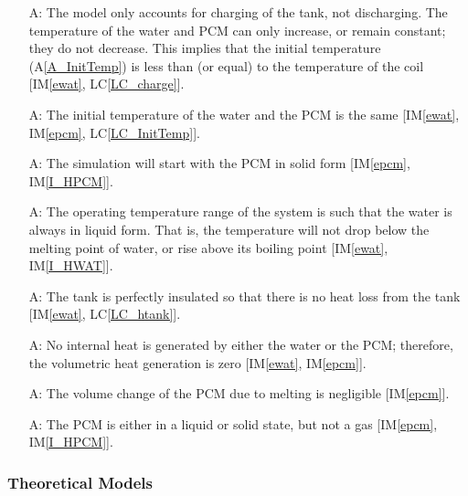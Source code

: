 \documentclass[12pt]{article}
\newcounter{assumpnum} %
\newcommand{\aref}[1]{A\ref{#1}}
\newcommand{\iref}[1]{IM\ref{#1}}
\newcommand{\lcref}[1]{LC\ref{#1}}
\begin{document}
\begin{itemize}
\item[A\refstepcounter{assumpnum}\theassumpnum \label{A_charge}:] The model only
  accounts for charging of the tank, not discharging.  The temperature of the
  water and PCM can only increase, or remain constant; they do not decrease.
  This implies that the initial temperature (\aref{A_InitTemp}) is less than (or
  equal) to the temperature of the coil [\iref{ewat}, \lcref{LC_charge}].

\item[A\refstepcounter{assumpnum}\theassumpnum \label{A_InitTemp}:] The
  initial temperature of the water and the PCM is the same [\iref{ewat},
  \iref{epcm}, \lcref{LC_InitTemp}].

\item[A\refstepcounter{assumpnum}\theassumpnum \label{A_OpRangePCM}:] The
  simulation will start with the PCM in solid form [\iref{epcm}, \iref{I_HPCM}].

\item[A\refstepcounter{assumpnum}\theassumpnum \label{A_OpRange}:] The operating
  temperature range of the system is such that the water is always in liquid
  form.  That is, the temperature will not drop below the melting point of water, or rise
  above its boiling point [\iref{ewat}, \iref{I_HWAT}].

\item[A\refstepcounter{assumpnum}\theassumpnum \label{A_htank}:] The tank is
  perfectly insulated so that there is no heat loss from the tank [\iref{ewat},
  \lcref{LC_htank}].

\item[A\refstepcounter{assumpnum}\theassumpnum \label{A_int_heat}:] No internal
  heat is generated by either the water or the PCM; therefore, the volumetric
  heat generation is zero [\iref{ewat}, \iref{epcm}].
	
\item[A\refstepcounter{assumpnum}\theassumpnum \label{A_vpcm}:] The volume
  change of the PCM due to melting is negligible [\iref{epcm}].

\item[A\refstepcounter{assumpnum}\theassumpnum \label{A_PCM_state}:] The PCM is
  either in a liquid or solid state, but not a gas [\iref{epcm}, \iref{I_HPCM}].
	
\end{itemize}

\subsubsection{Theoretical Models}\label{sec_theoretical}
\end{document}
